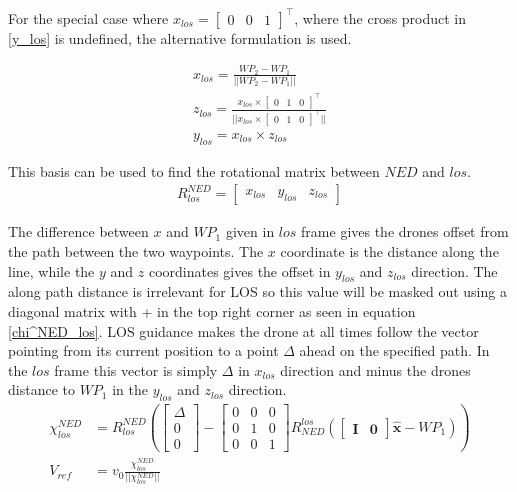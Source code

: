 For the special case where $x_{los} = \begin{bmatrix} 0&0&1\end{bmatrix}^\top$, where the cross product in \ref{y_los} is undefined, the alternative formulation is used.

\begin{align}
    x_{los} = \frac{WP_2 - WP_1}{||WP_2 - WP_1||} \\
    z_{los} = \frac{x_{los} \times \begin{bmatrix} 0&1&0\end{bmatrix}^\top}{|| x_{los} \times \begin{bmatrix} 0&1&0\end{bmatrix}^\top ||}\label{y_los}\\ 
    y_{los} = x_{los} \times z_{los}
\end{align}

This basis can be used to find the rotational matrix between $NED$ and $los$.
\begin{align}
    R^{NED}_{los} = \begin{bmatrix} x_{los} & y_{los} & z_{los}\end{bmatrix}
\end{align}

The difference between $x$ and $WP_1$ given in $los$ frame gives the drones offset from the path between the two waypoints. The $x$ coordinate is the distance along the line, while the $y$ and $z$ coordinates gives the offset in $y_{los}$ and $z_{los}$ direction. The along path distance is irrelevant for LOS so this value will be masked out using a diagonal matrix with + in the top right corner as seen in equation \ref{chi^NED_los}. LOS guidance makes the drone at all times follow the vector pointing from its current position to a point $\Delta$ ahead on the specified path. In the $los$ frame this vector is simply $\Delta$ in $x_{los}$ direction and minus the drones distance to $WP_1$ in the $y_{los}$ and $z_{los}$ direction. 
\begin{align}
   \chi^{NED}_{los} & = R^{NED}_{los} \left(  \begin{bmatrix}\Delta \\ 0 \\ 0\end{bmatrix} - \begin{bmatrix} 0 & 0 & 0 \\ 0 & 1 & 0 \\ 0 & 0 & 1 \end{bmatrix} R^{los}_{NED} (\begin{bmatrix} \mathbf{I} & \mathbf{0} \end{bmatrix} \hat{\textbf{x}} - WP_1) \right) \label{chi^NED_los} \\
   V_{ref} & = v_0 \frac{\chi^{NED}_{los} }{|| \chi^{NED}_{los} ||}
\end{align}

